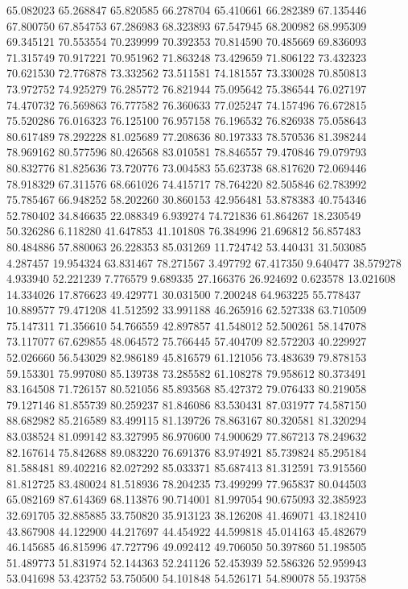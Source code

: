 65.082023
65.268847
65.820585
66.278704
65.410661
66.282389
67.135446
67.800750
67.854753
67.286983
68.323893
67.547945
68.200982
68.995309
69.345121
70.553554
70.239999
70.392353
70.814590
70.485669
69.836093
71.315749
70.917221
70.951962
71.863248
73.429659
71.806122
73.432323
70.621530
72.776878
73.332562
73.511581
74.181557
73.330028
70.850813
73.972752
74.925279
76.285772
76.821944
75.095642
75.386544
76.027197
74.470732
76.569863
76.777582
76.360633
77.025247
74.157496
76.672815
75.520286
76.016323
76.125100
76.957158
76.196532
76.826938
75.058643
80.617489
78.292228
81.025689
77.208636
80.197333
78.570536
81.398244
78.969162
80.577596
80.426568
83.010581
78.846557
79.470846
79.079793
80.832776
81.825636
73.720776
73.004583
55.623738
68.817620
72.069446
78.918329
67.311576
68.661026
74.415717
78.764220
82.505846
62.783992
75.785467
66.948252
58.202260
30.860153
42.956481
53.878383
40.754346
52.780402
34.846635
22.088349
6.939274
74.721836
61.864267
18.230549
50.326286
6.118280
41.647853
41.101808
76.384996
21.696812
56.857483
80.484886
57.880063
26.228353
85.031269
11.724742
53.440431
31.503085
4.287457
19.954324
63.831467
78.271567
3.497792
67.417350
9.640477
38.579278
4.933940
52.221239
7.776579
9.689335
27.166376
26.924692
0.623578
13.021608
14.334026
17.876623
49.429771
30.031500
7.200248
64.963225
55.778437
10.889577
79.471208
41.512592
33.991188
46.265916
62.527338
63.710509
75.147311
71.356610
54.766559
42.897857
41.548012
52.500261
58.147078
73.117077
67.629855
48.064572
75.766445
57.404709
82.572203
40.229927
52.026660
56.543029
82.986189
45.816579
61.121056
73.483639
79.878153
59.153301
75.997080
85.139738
73.285582
61.108278
79.958612
80.373491
83.164508
71.726157
80.521056
85.893568
85.427372
79.076433
80.219058
79.127146
81.855739
80.259237
81.846086
83.530431
87.031977
74.587150
88.682982
85.216589
83.499115
81.139726
78.863167
80.320581
81.320294
83.038524
81.099142
83.327995
86.970600
74.900629
77.867213
78.249632
82.167614
75.842688
89.083220
76.691376
83.974921
85.739824
85.295184
81.588481
89.402216
82.027292
85.033371
85.687413
81.312591
73.915560
81.812725
83.480024
81.518936
78.204235
73.499299
77.965837
80.044503
65.082169
87.614369
68.113876
90.714001
81.997054
90.675093
32.385923
32.691705
32.885885
33.750820
35.913123
38.126208
41.469071
43.182410
43.867908
44.122900
44.217697
44.454922
44.599818
45.014163
45.482679
46.145685
46.815996
47.727796
49.092412
49.706050
50.397860
51.198505
51.489773
51.831974
52.144363
52.241126
52.453939
52.586326
52.959943
53.041698
53.423752
53.750500
54.101848
54.526171
54.890078
55.193758
